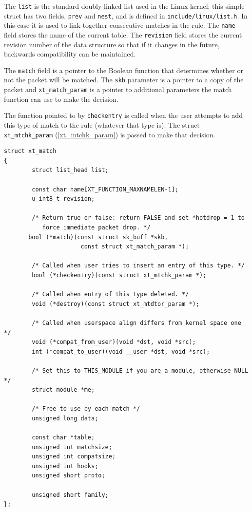 \documentclass[a4paper,10pt]{article}
\newcommand{\code}[1]{\texttt{{#1}}}
\begin{document}
The \code{list} is the standard doubly linked list used in
the Linux kernel; this simple struct has two fields, \code{prev} and
\code{nest}, and  is defined in \code{include/linux/list.h}. In this
case it is used to link together consecutive matches in the rule.
The \code{name} field stores the name of the current
table. The \code{revision} field stores the
current revision number of the data structure so that if it changes in
the future, backwards compatibility can be maintained.

The \code{match} field is a pointer to the Boolean function that
determines whether or not the packet will be matched. The \code{skb}
parameter is a pointer to a copy of the packet and
\code{xt\_match\_param} is a pointer to additional parameters the
match function can use to make the decision.

The function pointed to by \code{checkentry} is called when the user
attempts to add this type of match to the rule (whatever that type is). The struct
\code{xt\_mtchk\_param} (\ref{xt_mtchk_param}) is passed to make that decision. 

\begin{lstlisting}
struct xt_match
{
        struct list_head list;

        const char name[XT_FUNCTION_MAXNAMELEN-1];
        u_int8_t revision;

        /* Return true or false: return FALSE and set *hotdrop = 1 to                                                                                       
           force immediate packet drop. */
       bool (*match)(const struct sk_buff *skb,
                      const struct xt_match_param *);

        /* Called when user tries to insert an entry of this type. */
        bool (*checkentry)(const struct xt_mtchk_param *);

        /* Called when entry of this type deleted. */
        void (*destroy)(const struct xt_mtdtor_param *);

        /* Called when userspace align differs from kernel space one */
        void (*compat_from_user)(void *dst, void *src);
        int (*compat_to_user)(void __user *dst, void *src);

        /* Set this to THIS_MODULE if you are a module, otherwise NULL */
        struct module *me;

        /* Free to use by each match */
        unsigned long data;

        const char *table;
        unsigned int matchsize;
        unsigned int compatsize;
        unsigned int hooks;
        unsigned short proto;

        unsigned short family;
};
        
\end{lstlisting}
\end{document}
